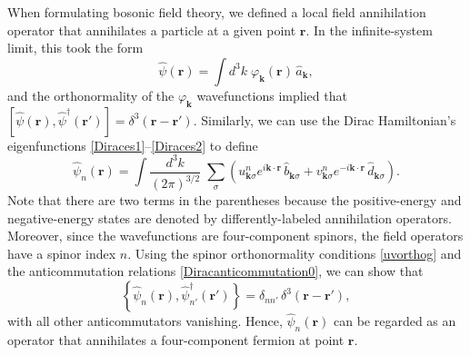 \documentclass[prx,12pt]{revtex4-2}
\begin{document}
When formulating bosonic field theory, we defined a local field
annihilation operator that annihilates a particle at a given point
$\mathbf{r}$.  In the infinite-system limit, this took the form
\begin{equation}
  \hat{\psi}(\mathbf{r})
  = \int d^3k \; \varphi_{\mathbf{k}}(\mathbf{r}) \, \hat{a}_{\mathbf{k}},
\end{equation}
and the orthonormality of the $\varphi_{\mathbf{k}}$ wavefunctions
implied that $[\hat{\psi}(\mathbf{r}),
  \hat{\psi}^\dagger(\mathbf{r}')] =
\delta^3(\mathbf{r}-\mathbf{r}')$.  Similarly, we can use the Dirac
Hamiltonian's eigenfunctions \eqref{Diraces1}--\eqref{Diraces2} to
define
\begin{equation}
  \hat{\psi}_n(\mathbf{r})
  = \int \frac{d^3k}{(2\pi)^{3/2}} \; \sum_\sigma
  \left(
  u^n_{\mathbf{k}\sigma} e^{i\mathbf{k}\cdot\mathbf{r}} \, \hat{b}_{\mathbf{k}\sigma}
  + v^n_{\mathbf{k}\sigma} e^{-i\mathbf{k}\cdot\mathbf{r}} \, \hat{d}_{\mathbf{k}\sigma}\right).
  \label{Diracpsi0}
\end{equation}
Note that there are two terms in the parentheses because the
positive-energy and negative-energy states are denoted by
differently-labeled annihilation operators.  Moreover, since the
wavefunctions are four-component spinors, the field operators have a
spinor index $n$.  Using the spinor orthonormality conditions
\eqref{uvorthog} and the anticommutation relations
\eqref{Diracanticommutation0}, we can show that
\begin{equation}
  \left\{\hat{\psi}_n(\mathbf{r}), \hat{\psi}_{n'}^{\dagger}(\mathbf{r}')\right\}
  = \delta_{nn'}\, \delta^3(\mathbf{r}-\mathbf{r}'),
\end{equation}
with all other anticommutators vanishing.  Hence,
$\hat{\psi}_n(\mathbf{r})$ can be regarded as an operator that
annihilates a four-component fermion at point $\mathbf{r}$.
\end{document}
